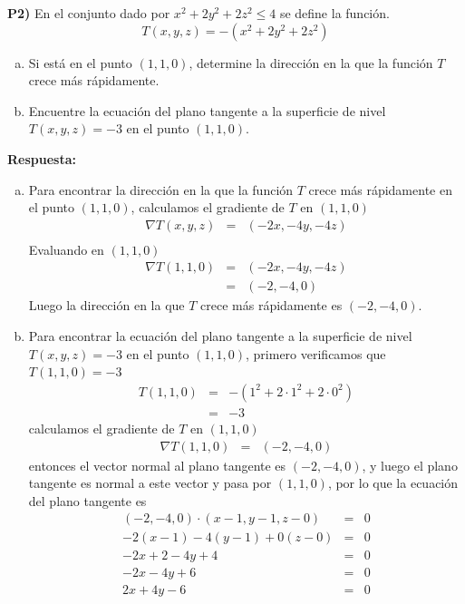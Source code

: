 \documentclass{article}
\begin{document}
\newpage
\noindent\textbf{P2) } En el conjunto dado por $x^2+2y^2+2z^2\leq4$ se define la función.
$$T(x,y,z)=-(x^2+2y^2+2z^2)$$
\begin{enumerate}[a)]
\item Si está en el punto $(1,1,0)$, determine la dirección en la que la función $T$ crece más rápidamente.
\item Encuentre la ecuación del plano tangente a la superficie de nivel $T(x,y,z)=-3$ en el punto $(1,1,0)$.
\end{enumerate}

\vspace{5mm}
\noindent\textbf{Respuesta:}
\begin{enumerate}[a)]
  \item Para encontrar la dirección en la que la función $T$ crece más rápidamente en el punto $(1,1,0)$, calculamos el gradiente de $T$ en $(1,1,0)$
  \begin{eqnarray*}
    \nabla T(x,y,z) &=& (-2x,-4y,-4z)\\
  \end{eqnarray*}
  Evaluando en $(1,1,0)$
  \begin{eqnarray*}
    \nabla T(1,1,0) &=& \left(-2x,-4y,-4z\right)\\
    &=& (-2,-4,0)
  \end{eqnarray*}
  Luego la dirección en la que $T$ crece más rápidamente es $(-2,-4,0)$.
  \item Para encontrar la ecuación del plano tangente a la superficie de nivel $T(x,y,z)=-3$ en el punto $(1,1,0)$, primero verificamos que $T(1,1,0)=-3$
  \begin{eqnarray*}
    T(1,1,0) &=& -(1^2+2\cdot1^2+2\cdot0^2)\\
    &=& -3
  \end{eqnarray*}
  calculamos el gradiente de $T$ en $(1,1,0)$
  \begin{eqnarray*}
    \nabla T(1,1,0) &=& (-2,-4,0)
  \end{eqnarray*}
  entonces el vector normal al plano tangente es $(-2,-4,0)$, y luego el plano tangente es normal a este vector y pasa por $(1,1,0)$, por lo que la ecuación del plano tangente es
  \begin{eqnarray*}
    (-2,-4,0)\cdot(x-1,y-1,z-0) &=& 0\\
    -2(x-1)-4(y-1)+0(z-0) &=& 0\\
    -2x+2-4y+4 &=& 0\\
    -2x-4y+6 &=& 0\\
    2x+4y-6 &=& 0
  \end{eqnarray*}
\end{enumerate}
\end{document}
